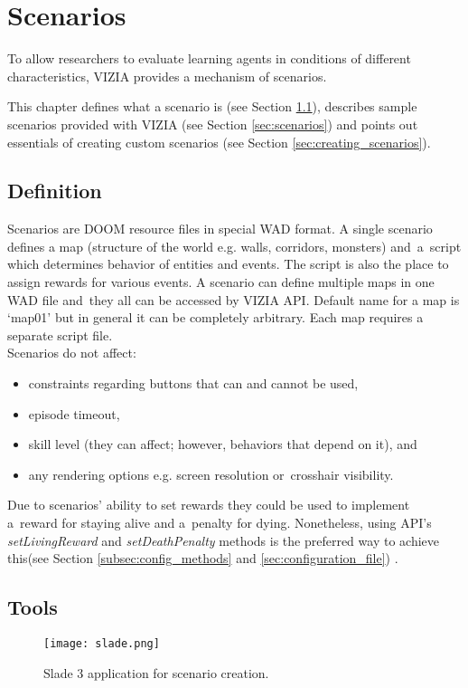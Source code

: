 \chapter{Scenarios}\label{ch:scenarios}

To allow researchers to evaluate learning agents in conditions of different characteristics, VIZIA provides a mechanism of scenarios.

This chapter defines what a scenario is (see Section \ref{sec:scenario_definition}), describes sample scenarios provided with VIZIA (see Section \ref{sec:scenarios}) and points out essentials of creating custom scenarios (see Section \ref{sec:creating_scenarios}).

\section{Definition}\label{sec:scenario_definition}
	Scenarios are DOOM resource files in special WAD format. A single scenario defines a map (structure of the world e.g. walls, corridors, monsters) and~a~script which determines behavior of entities and events. The script is also the place to assign rewards for various events. A scenario can define multiple maps in one WAD file and~they all can be accessed by VIZIA API. Default name for a map is `map01' but in general it can be completely arbitrary. Each map requires a separate script file.
	\\
	Scenarios do not affect:
	\begin{itemize}
		\item constraints regarding buttons that can and cannot be used,
		\item episode timeout,
		\item skill level (they can affect; however, behaviors that depend on it), and
		\item any rendering options e.g. screen resolution or~crosshair visibility.
	\end{itemize}

	Due to scenarios' ability to set rewards they could be used to implement a~reward for staying alive and a~penalty for dying. Nonetheless, using API's \emph{setLivingReward} and \emph{setDeathPenalty} methods is the preferred way to achieve this(see Section \ref{subsec:config_methods} and \ref{sec:configuration_file}) .

\section{Tools}\label{sec:tools}
	\begin{figure}
			\centering
			\texttt{[image: slade.png]}
			\caption{Slade 3 application for scenario creation.}\label{fig:slade}
	\end{figure}

